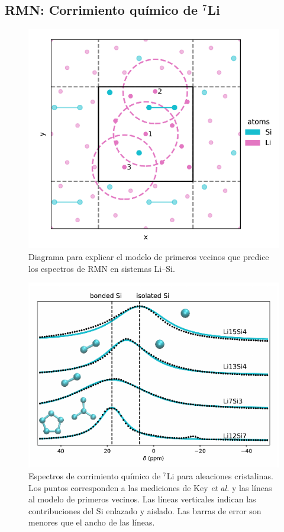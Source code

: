 \subsection{RMN: Corrimiento químico de $^7$Li}

\begin{figure}[h!]
    \centering
    \includegraphics[width=.7\textwidth]{Silicio/prediccion/resultados/nmr/viz.png}
    \caption{Diagrama para explicar el modelo de primeros vecinos que predice los
    espectros de RMN en sistemas Li--Si.} 
    \label{fig:viz}
\end{figure}

\begin{figure}[h!]
    \centering
    \includegraphics[width=.7\textwidth]{Silicio/prediccion/resultados/nmr/c-nmr.png}
    \caption{Espectros de corrimiento químico de $^7$Li para aleaciones 
    cristalinas. Los puntos corresponden a las mediciones de Key \textit{et al.}
    y las líneas al modelo de primeros vecinos. Las líneas verticales indican las 
    contribuciones del Si enlazado y aislado. Las barras de error son menores que
    el ancho de las líneas.}
    \label{fig:c-nmr}
\end{figure}

